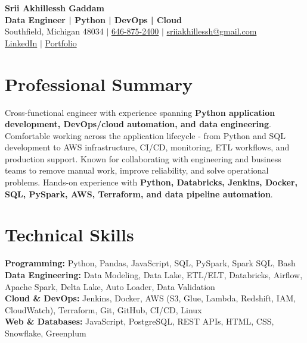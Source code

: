\documentclass[letterpaper,10pt]{article}
\begin{document}
\fontsize{9.35pt}{10.45pt}\selectfont

\begin{center}
    {\LARGE \textbf{Srii Akhillessh Gaddam}} \\[-1pt]
    \textbf{Data Engineer | Python | DevOps | Cloud} \\[2pt]
    Southfield, Michigan 48034 $|$
    \href{tel:6468752400}{646-875-2400} $|$
    \href{mailto:sriiakhillessh@gmail.com}{sriiakhillessh@gmail.com} \\[1pt]
    \href{https://www.linkedin.com/in/srii-akhiilessh-gaddam-b48668191/}{LinkedIn} $|$
    \href{https://sriiakhillesshg.github.io/portfolio/}{Portfolio}
\end{center}
\vspace{-8pt}

\section{Professional Summary}
\small{Cross-functional engineer with experience spanning \textbf{Python application development, DevOps/cloud automation, and data engineering}. Comfortable working across the application lifecycle - from Python and SQL development to AWS infrastructure, CI/CD, monitoring, ETL workflows, and production support. Known for collaborating with engineering and business teams to remove manual work, improve reliability, and solve operational problems. Hands-on experience with \textbf{Python, Databricks, Jenkins, Docker, SQL, PySpark, AWS, Terraform, and data pipeline automation}.}

\section{Technical Skills}
\small{
\textbf{Programming:} Python, Pandas, JavaScript, SQL, PySpark, Spark SQL, Bash \\
\textbf{Data Engineering:} Data Modeling, Data Lake, ETL/ELT, Databricks, Airflow, Apache Spark, Delta Lake, Auto Loader, Data Validation \\
\textbf{Cloud \& DevOps:} Jenkins, Docker, AWS (S3, Glue, Lambda, Redshift, IAM, CloudWatch), Terraform, Git, GitHub, CI/CD, Linux \\
\textbf{Web \& Databases:} JavaScript, PostgreSQL, REST APIs, HTML, CSS, Snowflake, Greenplum
}
\end{document}
